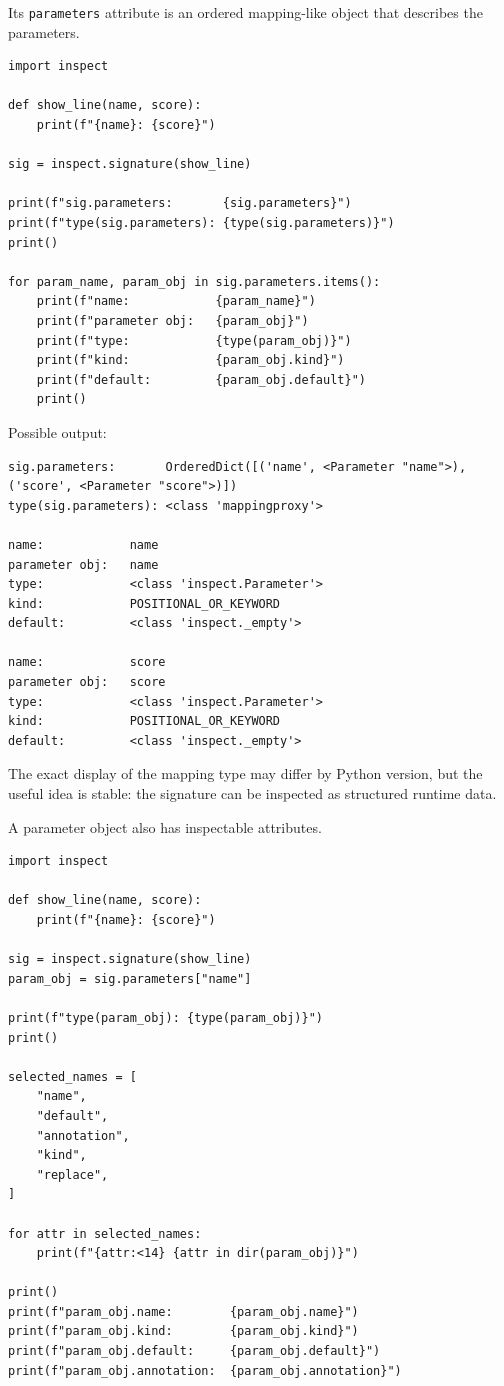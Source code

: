 Its \texttt{parameters} attribute is an ordered mapping-like object that describes the parameters.

\begin{verbatim}
import inspect

def show_line(name, score):
    print(f"{name}: {score}")

sig = inspect.signature(show_line)

print(f"sig.parameters:       {sig.parameters}")
print(f"type(sig.parameters): {type(sig.parameters)}")
print()

for param_name, param_obj in sig.parameters.items():
    print(f"name:            {param_name}")
    print(f"parameter obj:   {param_obj}")
    print(f"type:            {type(param_obj)}")
    print(f"kind:            {param_obj.kind}")
    print(f"default:         {param_obj.default}")
    print()
\end{verbatim}

Possible output:

\begin{verbatim}
sig.parameters:       OrderedDict([('name', <Parameter "name">), ('score', <Parameter "score">)])
type(sig.parameters): <class 'mappingproxy'>

name:            name
parameter obj:   name
type:            <class 'inspect.Parameter'>
kind:            POSITIONAL_OR_KEYWORD
default:         <class 'inspect._empty'>

name:            score
parameter obj:   score
type:            <class 'inspect.Parameter'>
kind:            POSITIONAL_OR_KEYWORD
default:         <class 'inspect._empty'>
\end{verbatim}

The exact display of the mapping type may differ by Python version, but the useful idea is stable: the signature can be inspected as structured runtime data.

A parameter object also has inspectable attributes.

\begin{verbatim}
import inspect

def show_line(name, score):
    print(f"{name}: {score}")

sig = inspect.signature(show_line)
param_obj = sig.parameters["name"]

print(f"type(param_obj): {type(param_obj)}")
print()

selected_names = [
    "name",
    "default",
    "annotation",
    "kind",
    "replace",
]

for attr in selected_names:
    print(f"{attr:<14} {attr in dir(param_obj)}")

print()
print(f"param_obj.name:        {param_obj.name}")
print(f"param_obj.kind:        {param_obj.kind}")
print(f"param_obj.default:     {param_obj.default}")
print(f"param_obj.annotation:  {param_obj.annotation}")
\end{verbatim}

